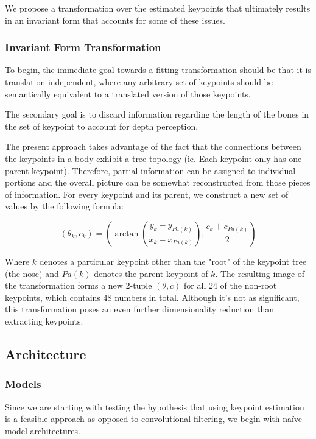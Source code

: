 \documentclass{article}
\begin{document}
We propose a transformation over the estimated keypoints that ultimately results in an invariant form that accounts for some of these issues.

\subsubsection{Invariant Form Transformation}

To begin, the immediate goal towards a fitting transformation should be that it is translation independent, where any arbitrary set of keypoints should be semantically equivalent to a translated version of those keypoints.

The secondary goal is to discard information regarding the length of the bones in the set of keypoint to account for depth perception.

The present approach takes advantage of the fact that the connections between the keypoints in a body exhibit a tree topology (ie. Each keypoint only has one parent keypoint). Therefore, partial information can be assigned to individual portions and the overall picture can be somewhat reconstructed from those pieces of information. For every keypoint and its parent, we construct a new set of values by the following formula:

$$
(\theta_k,c_k) = \left(\arctan \left(\frac{y_k -y_{Pa(k)}}{x_k -x_{Pa(k)}} \right), \frac{c_k + c_{Pa(k)}}{2}\right)
$$

Where $k$ denotes a particular keypoint other than the "root" of the keypoint tree (the nose) and $Pa(k)$ denotes the parent keypoint of $k$. The resulting image of the transformation forms a new 2-tuple $(\theta, c)$ for all 24 of the non-root keypoints, which contains 48 numbers in total. Although it's not as significant, this transformation poses an even further dimensionality reduction than extracting keypoints.

\subsection{Architecture}

\subsubsection{Models}

Since we are starting with testing the hypothesis that using keypoint estimation is a feasible approach as opposed to convolutional filtering, we begin with na\"ive model architectures.
\end{document}
